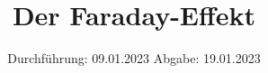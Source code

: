 

\subject{V46}
\title{Der Faraday-Effekt}
\date{%
  Durchführung: 09.01.2023
  \hspace{3em}
  Abgabe: 19.01.2023
}



\maketitle
\thispagestyle{empty}
\tableofcontents
\newpage






%

\printbibliography{}


